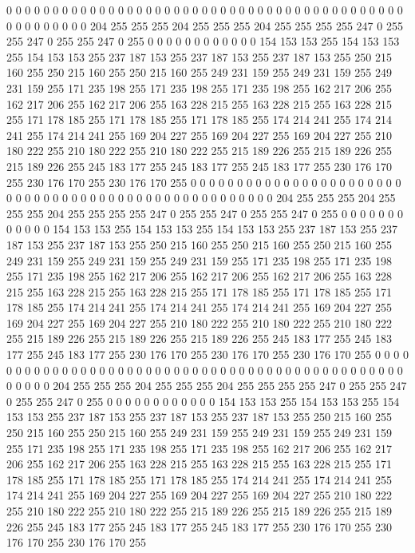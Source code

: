 0 0 0 0 0 0 0 0 0 0 0 0 0 0 0 0 0 0 0 0 0 0 0 0 0 0 0 0 0 0 0 0 0 0 0 0 0 0 0 0 0 0 0 0 0 0 0 0 0 0 0 0 204 255 255 255 204 255 255 255 204 255 255 255
255 247 0 255 255 247 0 255 255 247 0 255 0 0 0 0 0 0 0 0 0 0 0 0 154 153 153 255 154 153 153 255 154 153 153 255 237 187 153 255 237 187 153 255 237 187 153 255 250 215 160 255 250 215 160 255 250 215 160 255 249 231 159 255
249 231 159 255 249 231 159 255 171 235 198 255 171 235 198 255 171 235 198 255 162 217 206 255 162 217 206 255 162 217 206 255 163 228 215 255 163 228 215 255 163 228 215 255 171 178 185 255 171 178 185 255 171 178 185 255 174 214 241 255 174 214 241 255
174 214 241 255 169 204 227 255 169 204 227 255 169 204 227 255 210 180 222 255 210 180 222 255 210 180 222 255 215 189 226 255 215 189 226 255 215 189 226 255 245 183 177 255 245 183 177 255 245 183 177 255 230 176 170 255 230 176 170 255 230 176 170 255
0 0 0 0 0 0 0 0 0 0 0 0 0 0 0 0 0 0 0 0 0 0 0 0 0 0 0 0 0 0 0 0 0 0 0 0 0 0 0 0 0 0 0 0 0 0 0 0 0 0 0 0 204 255 255 255 204 255 255 255 204 255 255 255
255 247 0 255 255 247 0 255 255 247 0 255 0 0 0 0 0 0 0 0 0 0 0 0 154 153 153 255 154 153 153 255 154 153 153 255 237 187 153 255 237 187 153 255 237 187 153 255 250 215 160 255 250 215 160 255 250 215 160 255 249 231 159 255
249 231 159 255 249 231 159 255 171 235 198 255 171 235 198 255 171 235 198 255 162 217 206 255 162 217 206 255 162 217 206 255 163 228 215 255 163 228 215 255 163 228 215 255 171 178 185 255 171 178 185 255 171 178 185 255 174 214 241 255 174 214 241 255
174 214 241 255 169 204 227 255 169 204 227 255 169 204 227 255 210 180 222 255 210 180 222 255 210 180 222 255 215 189 226 255 215 189 226 255 215 189 226 255 245 183 177 255 245 183 177 255 245 183 177 255 230 176 170 255 230 176 170 255 230 176 170 255
0 0 0 0 0 0 0 0 0 0 0 0 0 0 0 0 0 0 0 0 0 0 0 0 0 0 0 0 0 0 0 0 0 0 0 0 0 0 0 0 0 0 0 0 0 0 0 0 0 0 0 0 204 255 255 255 204 255 255 255 204 255 255 255
255 247 0 255 255 247 0 255 255 247 0 255 0 0 0 0 0 0 0 0 0 0 0 0 154 153 153 255 154 153 153 255 154 153 153 255 237 187 153 255 237 187 153 255 237 187 153 255 250 215 160 255 250 215 160 255 250 215 160 255 249 231 159 255
249 231 159 255 249 231 159 255 171 235 198 255 171 235 198 255 171 235 198 255 162 217 206 255 162 217 206 255 162 217 206 255 163 228 215 255 163 228 215 255 163 228 215 255 171 178 185 255 171 178 185 255 171 178 185 255 174 214 241 255 174 214 241 255
174 214 241 255 169 204 227 255 169 204 227 255 169 204 227 255 210 180 222 255 210 180 222 255 210 180 222 255 215 189 226 255 215 189 226 255 215 189 226 255 245 183 177 255 245 183 177 255 245 183 177 255 230 176 170 255 230 176 170 255 230 176 170 255
